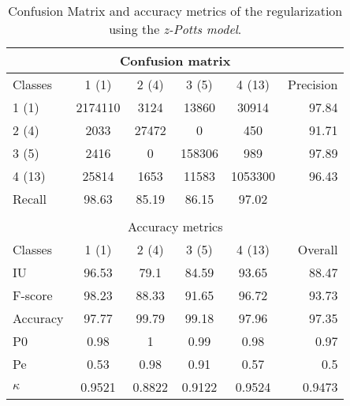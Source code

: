 \begin{table}[H]
\begin{center}
\footnotesize
\begin{tabular}{|l|c|c|c|c|r|}
\hline
\multicolumn{6}{|c|}{Confusion matrix} \\
\hline
 Classes & 1 (1) & 2 (4) & 3 (5) & 4 (13) & Precision \\
\hline
1 (1) & 2174110 & 3124 & 13860 & 30914 & 97.84 \\
\hline
2 (4) & 2033 & 27472 & 0 & 450 & 91.71 \\
\hline
3 (5) & 2416 & 0 & 158306 & 989 & 97.89 \\
\hline
4 (13) & 25814 & 1653 & 11583 & 1053300 & 96.43 \\
\hline
Recall & 98.63 & 85.19 & 86.15 & 97.02 &  \\
\hline
\multicolumn{6}{c}{ } \\
\hline
\multicolumn{6}{|c|}{Accuracy metrics} \\
\hline
 Classes & 1 (1) & 2 (4) & 3 (5) & 4 (13) & Overall \\
\hline
IU & 96.53 & 79.1 & 84.59 & 93.65 & 88.47 \\
\hline
F-score & 98.23 & 88.33 & 91.65 & 96.72 & 93.73 \\
\hline
Accuracy & 97.77 & 99.79 & 99.18 & 97.96 & 97.35 \\
\hline
P0 & 0.98 & 1 & 0.99 & 0.98 & 0.97 \\
\hline
Pe & 0.53 & 0.98 & 0.91 & 0.57 & 0.5 \\
\hline
$\kappa$ & 0.9521 & 0.8822 & 0.9122 & 0.9524 & 0.9473 \\
\hline
\end{tabular}
\caption{Confusion Matrix and accuracy metrics of the regularization using the \textit{z-Potts model}.}
\label{table:}
\end{center}
\end{table}
